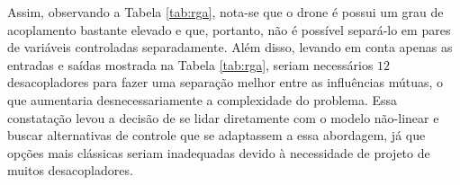 Assim, observando a Tabela 
\ref{tab:rga}, nota-se que o drone é possui um grau de acoplamento bastante elevado e que, portanto, 
não é possível separá-lo em pares de variáveis controladas separadamente. Além disso, levando em conta 
apenas as entradas e saídas mostrada na Tabela \ref{tab:rga}, seriam necessários $12$ desacopladores para 
fazer uma separação melhor entre as influências mútuas, o que aumentaria desnecessariamente a complexidade 
do problema. Essa constatação levou a decisão de se lidar diretamente com o modelo não-linear e buscar 
alternativas de controle que se adaptassem a essa abordagem, já que opções mais clássicas seriam inadequadas 
devido à necessidade de projeto de muitos desacopladores.